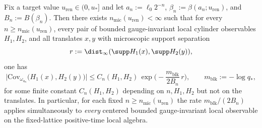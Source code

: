\begin{lemma}\label{lem:block_decay_to_micro}
Fix a target value $u_{\mathrm{ren}}\in(0,u_\ast]$ and let $a_n:=\ell_0 2^{-n}$, $\beta_n:=\beta(a_n;u_{\mathrm{ren}})$, and $B_n:=B(\beta_n)$.
Then there exists $n_{\mathrm{mic}}(u_{\mathrm{ren}})<\infty$ such that for every $n\ge n_{\mathrm{mic}}(u_{\mathrm{ren}})$, every pair of bounded gauge-invariant local cylinder observables $H_1,H_2$, and all translates $x,y$ with microscopic support separation
\[
r:=\dist_\infty(\supp H_1(x),\supp H_2(y)),
\]
one has
\begin{equation}\label{eq:block_to_micro_exact_transfer}
\big|\mathrm{Cov}_{\omega_{a_n}}\big(H_1(x),H_2(y)\big)\big|
\le C_n(H_1,H_2)\,
\exp\!\Big(-\frac{m_{\mathrm{blk}}}{2B_n}\,r\Big),
\qquad m_{\mathrm{blk}}:=-\log q_\ast,
\end{equation}
for some finite constant $C_n(H_1,H_2)$ depending on $n,H_1,H_2$ but not on the translates.
In particular, for each fixed $n\ge n_{\mathrm{mic}}(u_{\mathrm{ren}})$ the rate $m_{\mathrm{blk}}/(2B_n)$ applies simultaneously to \emph{every} centered bounded gauge-invariant local observable on the fixed-lattice positive-time local algebra.
\end{lemma}

